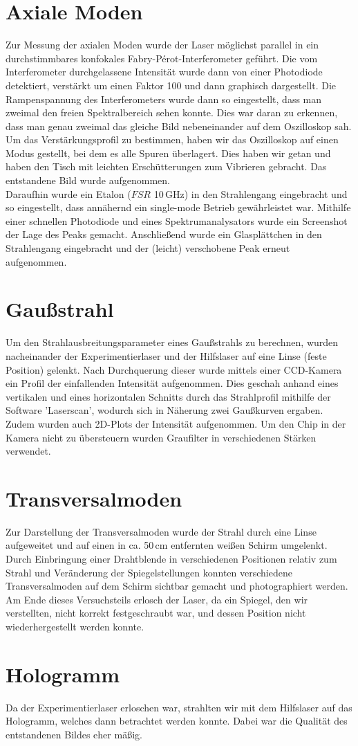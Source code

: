 \section{Axiale Moden}
Zur Messung der axialen Moden wurde der Laser möglichst parallel in ein durchstimmbares konfokales Fabry-Pérot-Interferometer geführt. Die vom Interferometer durchgelassene Intensität wurde dann von einer 
Photodiode detektiert, verstärkt um einen Faktor 100 und dann graphisch dargestellt. Die Rampenspannung des Interferometers wurde dann so eingestellt, 
dass man zweimal den freien Spektralbereich sehen konnte. Dies war daran zu erkennen, dass man genau zweimal das gleiche Bild nebeneinander auf dem Oszilloskop sah. \\
Um das Verstärkungsprofil zu bestimmen, haben wir das Oszilloskop auf einen Modus gestellt, bei dem es alle Spuren 
überlagert. Dies haben wir getan und haben den Tisch mit leichten Erschütterungen zum Vibrieren gebracht. Das entstandene Bild wurde aufgenommen. \\
Daraufhin wurde ein Etalon ($FSR$ 10\,GHz) in den Strahlengang eingebracht und so eingestellt, dass annähernd ein single-mode Betrieb gewährleistet war. 
Mithilfe einer schnellen Photodiode und eines Spektrumanalysators wurde ein Screenshot der Lage des Peaks gemacht. Anschließend wurde ein Glasplättchen in den Strahlengang eingebracht und der (leicht) verschobene 
Peak erneut aufgenommen.

\section{Gaußstrahl}
Um den Strahlausbreitungsparameter eines Gaußstrahls zu berechnen, wurden nacheinander der Experimentierlaser und der Hilfslaser auf eine Linse (feste Position) gelenkt. Nach 
Durchquerung dieser wurde mittels einer CCD-Kamera ein Profil der einfallenden Intensität aufgenommen. Dies geschah anhand eines vertikalen und eines horizontalen Schnitts 
durch das Strahlprofil mithilfe der Software 'Laserscan', wodurch sich in Näherung zwei Gaußkurven ergaben. Zudem wurden auch 2D-Plots der Intensität aufgenommen. 
Um den Chip in der Kamera nicht zu übersteuern wurden Graufilter in verschiedenen Stärken verwendet.

\section{Transversalmoden}
Zur Darstellung der Transversalmoden wurde der Strahl durch eine Linse aufgeweitet und auf einen in ca. 50\,cm entfernten weißen Schirm umgelenkt. Durch Einbringung einer Drahtblende in verschiedenen Positionen relativ zum Strahl und Veränderung der 
Spiegelstellungen konnten verschiedene Transversalmoden auf dem Schirm sichtbar gemacht und photographiert werden. Am Ende dieses Versuchsteils erlosch der Laser, da ein Spiegel, 
den wir verstellten, nicht korrekt festgeschraubt war, und dessen Position nicht wiederhergestellt werden konnte.

\section{Hologramm}
Da der Experimentierlaser erloschen war, strahlten wir mit dem Hilfslaser auf das Hologramm, welches dann betrachtet werden konnte. Dabei war die Qualität des entstandenen Bildes eher mäßig.
